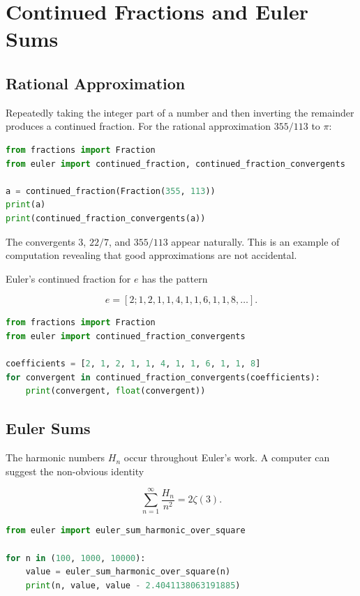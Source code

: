 \chapter{Continued Fractions and Euler Sums}
\label{ch:discovery_continued_fractions}

\section{Rational Approximation}

Repeatedly taking the integer part of a number and then inverting the remainder
produces a continued fraction. For the rational approximation $355/113$ to $\pi$:

\begin{lstlisting}[language=Python]
from fractions import Fraction
from euler import continued_fraction, continued_fraction_convergents

a = continued_fraction(Fraction(355, 113))
print(a)
print(continued_fraction_convergents(a))
\end{lstlisting}

The convergents $3$, $22/7$, and $355/113$ appear naturally. This is an example of
computation revealing that good approximations are not accidental.

Euler's continued fraction for $e$ has the pattern

\[
e=[2;1,2,1,1,4,1,1,6,1,1,8,\ldots].
\]

\begin{lstlisting}[language=Python]
from fractions import Fraction
from euler import continued_fraction_convergents

coefficients = [2, 1, 2, 1, 1, 4, 1, 1, 6, 1, 1, 8]
for convergent in continued_fraction_convergents(coefficients):
    print(convergent, float(convergent))
\end{lstlisting}

\section{Euler Sums}

The harmonic numbers $H_n$ occur throughout Euler's work. A computer can suggest
the non-obvious identity

\[
\sum_{n=1}^{\infty}\frac{H_n}{n^2}=2\zeta(3).
\]

\begin{lstlisting}[language=Python]
from euler import euler_sum_harmonic_over_square

for n in (100, 1000, 10000):
    value = euler_sum_harmonic_over_square(n)
    print(n, value, value - 2.4041138063191885)
\end{lstlisting}

